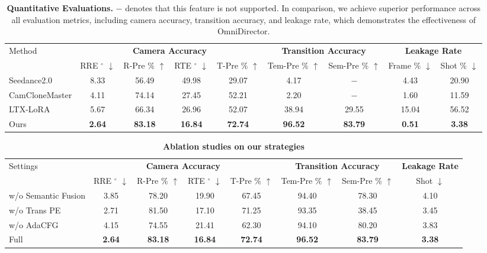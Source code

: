 \documentclass{llmxive}
\begin{document}
\begin{table}[t]
\centering
\begin{tabular}{l|c|c|c|c|c|c|c|c}
    \toprule
    \multirow{2}{*}{Method} & \multicolumn{4}{c|}{\textbf{Camera Accuracy}} & \multicolumn{2}{c|}{\textbf{Transition Accuracy}} & \multicolumn{2}{c}{\textbf{Leakage Rate}} \\
    \cline{2-9}
    & RRE $^{\circ}$ $\downarrow$ & R-Pre $\%$ $\uparrow$ & RTE $^{\circ}$ $\downarrow$ & T-Pre $\%$ $\uparrow$ & Tem-Pre $\%$ $\uparrow$ & Sem-Pre $\%$ $\uparrow$ & Frame $\%$ $\downarrow$ & Shot $\%$ $\downarrow$ \\
    \midrule
    Seedance2.0 & 8.33 & 56.49 &49.98 & 29.07 & 4.17 & $-$ & 4.43&20.90 \\
    CamCloneMaster & 4.11 & 74.14 &27.45 & 52.21 & 2.20 & $-$ &1.60&11.59\\
    LTX-LoRA &5.67 & 66.34 & 26.96 & 52.07 & 38.94 & 29.55&15.04&56.52\\
    Ours &\textbf{2.64} & \textbf{83.18} & \textbf{16.84} & \textbf{72.74} & \textbf{96.52} & \textbf{83.79}&\textbf{0.51}&\textbf{3.38}\\
    \bottomrule
\end{tabular}
\caption{\textbf{Quantitative Evaluations.} $-$ denotes that this feature is not supported. In comparison, we achieve superior performance across all evaluation metrics, including camera accuracy, transition accuracy, and leakage rate, which demonstrates the effectiveness of OmniDirector. }
\label{pose_comparison}
\end{table}

\begin{table}
\centering
\begin{tabular}{l|c|c|c|c|c|c|c}
    \toprule
    \multirow{2}{*}{Settings} & \multicolumn{4}{c|}{\textbf{Camera Accuracy}} & \multicolumn{2}{c|}{\textbf{Transition Accuracy}} & \textbf{Leakage Rate} \\
    \cline{2-8}
    & RRE $^{\circ}$ $\downarrow$ & R-Pre $\%$ $\uparrow$ & RTE $^{\circ}$ $\downarrow$ & T-Pre $\%$ $\uparrow$ & Tem-Pre $\%$ $\uparrow$ & Sem-Pre $\%$ $\uparrow$ & Shot $\downarrow$\\
    \midrule
    w/o Semantic Fusion& 3.85&78.20&19.90&67.45&94.40&78.30&4.10\\
    w/o Trans PE& 2.71&81.50&17.10&71.25&93.35&38.45&3.45\\
    w/o AdaCFG & 4.15& 74.55&21.41&62.30&94.10&80.20&3.83\\
    Full &\textbf{2.64} & \textbf{83.18} & \textbf{16.84} & \textbf{72.74} & \textbf{96.52} & \textbf{83.79}&\textbf{3.38}\\
    \bottomrule
\end{tabular}
\caption{\textbf{Ablation studies on our strategies} }
\vspace{-0.5cm}
\label{tab:ablation}
\end{table}
\end{document}

